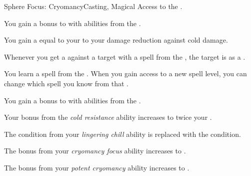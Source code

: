     \begin{feat}{Sphere Focus: Cryomancy}{Casting, Magical}
        \featpre Access to the  .

         You gain a  bonus to  with abilities from the  .

         You gain a  equal to your  to your damage reduction against cold damage.

         Whenever you get a  against a target with a spell from the  , the target is  as a .

         You learn a spell from the  .
        When you gain access to a new spell level, you can change which spell you know from that .

         You gain a  bonus to  with abilities from the  .

         Your bonus from the \textit{cold resistance} ability increases to twice your .

         The  condition from your \textit{lingering chill} ability is replaced with the  condition.

         The bonus from your \textit{cryomancy focus} ability increases to .

         The bonus from your \textit{potent cryomancy} ability increases to .
    \end{feat}

